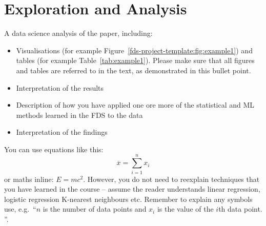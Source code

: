 \section{Exploration and Analysis}

    A data science analysis of the paper, including: \begin{itemize} \item
        Visualisations (for example Figure~\ref{fds-project-template:fig:example1}) and
        tables (for example Table~\ref{tab:example1}).
    Please make sure that all figures and tables are referred to in the text, as
        demonstrated in this bullet point.
    \item Interpretation of the results
    \item Description of how you have applied one ore more of the
    statistical and ML methods learned in the FDS to the data
    \item Interpretation of the findings
    \end{itemize}

    You can use equations like this:
    \begin{equation}
        \label{fds-project-template:eq:1} \overline{x} = \sum_{i=1}^n x_i
    \end{equation}
    or maths inline: $E=mc^2$.
    However, you do not need to reexplain techniques that you have learned in the
        course -- assume the reader understands linear regression, logistic regression
        K-nearest neighbours etc. Remember to explain any symbols use, e.g.~``$n$ is
        the number of data points and $x_i$ is the value of the $i$th data point.
    ''.